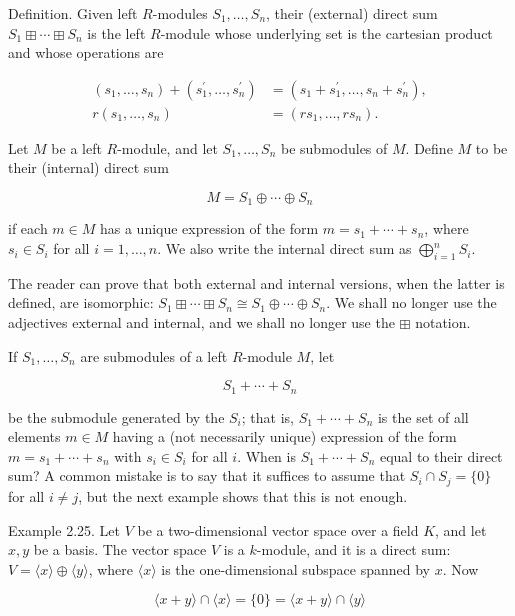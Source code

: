 \documentclass[10pt]{article}
\begin{document}
Definition. Given left $R$-modules $S_{1}, \ldots, S_{n}$, their (external) direct sum $S_{1} \boxplus \cdots \boxplus S_{n}$ is the left $R$-module whose underlying set is the cartesian product and whose operations are

$$
\begin{aligned}
\left(s_{1}, \ldots, s_{n}\right)+\left(s_{1}^{\prime}, \ldots, s_{n}^{\prime}\right) & =\left(s_{1}+s_{1}^{\prime}, \ldots, s_{n}+s_{n}^{\prime}\right), \\
r\left(s_{1}, \ldots, s_{n}\right) & =\left(r s_{1}, \ldots, r s_{n}\right) .
\end{aligned}
$$

Let $M$ be a left $R$-module, and let $S_{1}, \ldots, S_{n}$ be submodules of $M$. Define $M$ to be their (internal) direct sum

$$
M=S_{1} \oplus \cdots \oplus S_{n}
$$

if each $m \in M$ has a unique expression of the form $m=s_{1}+\cdots+s_{n}$, where $s_{i} \in S_{i}$ for all $i=1, \ldots, n$. We also write the internal direct sum as $\bigoplus_{i=1}^{n} S_{i}$.

The reader can prove that both external and internal versions, when the latter is defined, are isomorphic: $S_{1} \boxplus \cdots \boxplus S_{n} \cong S_{1} \oplus \cdots \oplus S_{n}$. We shall no longer use the adjectives external and internal, and we shall no longer use the $\boxplus$ notation.

If $S_{1}, \ldots, S_{n}$ are submodules of a left $R$-module $M$, let

$$
S_{1}+\cdots+S_{n}
$$

be the submodule generated by the $S_{i}$; that is, $S_{1}+\cdots+S_{n}$ is the set of all elements $m \in M$ having a (not necessarily unique) expression of the form $m=s_{1}+\cdots+s_{n}$ with $s_{i} \in S_{i}$ for all $i$. When is $S_{1}+\cdots+S_{n}$ equal to their direct sum? A common mistake is to say that it suffices to assume that $S_{i} \cap S_{j}=\{0\}$ for all $i \neq j$, but the next example shows that this is not enough.

Example 2.25. Let $V$ be a two-dimensional vector space over a field $K$, and let $x, y$ be a basis. The vector space $V$ is a $k$-module, and it is a direct sum: $V=\langle x\rangle \oplus\langle y\rangle$, where $\langle x\rangle$ is the one-dimensional subspace spanned by $x$. Now

$$
\langle x+y\rangle \cap\langle x\rangle=\{0\}=\langle x+y\rangle \cap\langle y\rangle
$$
\end{document}

